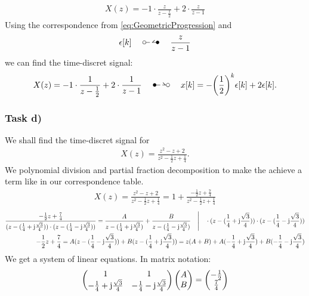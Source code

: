 \begin{align}
	X(z)=-1\cdot\frac{z}{z-\frac{1}{2}}+2\cdot\frac{z}{z-1}
\end{align}
Using the correspondence from \ref{eq:GeometricProgression} and 
\begin{align}
	\epsilon[k]\quad\ztransf\quad\frac{z}{z-1}
\end{align}
we can find the time-discret signal:
\begin{align}
	X(z)=-1\cdot\frac{1}{z-\frac{1}{2}}+2\cdot\frac{1}{z-1}\quad\Ztransf\quad x[k]=-\bigg(\frac{1}{2}\bigg)^k\epsilon[k]+2\epsilon[k].
\end{align}
\subsubsection{Task d)}
We shall find the time-discret signal for
\begin{align}
	X(z)=\frac{z^2-z+2}{z^2-\frac{1}{2}z+\frac{1}{4}}.
\end{align}
We polynomial division and partial fraction decomposition to make the achieve a term like in our correspondence table.
\begin{align}
	X(z)=\frac{z^2-z+2}{z^2-\frac{1}{2}z+\frac{1}{4}}=1+\frac{-\frac{1}{2}z+\frac{7}{4}}{z^2-\frac{1}{2}z+\frac{1}{4}}
\end{align}
\begin{align}
	\label{eq:TaskDPartialFractionDecomposition}
	\frac{-\frac{1}{2}z+\frac{7}{4}}{(z-(\frac{1}{4}+\im\frac{\sqrt{3}}{4}))\cdot(z-(\frac{1}{4}-\im\frac{\sqrt{3}}{4}))}=\frac{A}{z-(\frac{1}{4}+\im\frac{\sqrt{3}}{4})}+\frac{B}{z-(\frac{1}{4}-\im\frac{\sqrt{3}}{4})}\quad\Bigg | \quad \cdot (z-(\frac{1}{4}+\im\frac{\sqrt{3}}{4}))\cdot(z-(\frac{1}{4}-\im\frac{\sqrt{3}}{4}))\nonumber\\
	-\frac{1}{2}z+\frac{7}{4}=A(z-(\frac{1}{4}-\im\frac{\sqrt{3}}{4}))+B(z-(\frac{1}{4}+\im\frac{\sqrt{3}}{4}))=z(A+B)+A(-\frac{1}{4}+\im\frac{\sqrt{3}}{4})+B(-\frac{1}{4}-\im\frac{\sqrt{3}}{4})
\end{align}
We get a system of linear equations. In matrix notation:
\begin{align}
	\begin{pmatrix}
		1 & 1 \\
		-\frac{1}{4}+\im\frac{\sqrt{3}}{4} & -\frac{1}{4}-\im\frac{\sqrt{3}}{4} 
	\end{pmatrix}
	\begin{pmatrix}
		A \\
		B
	\end{pmatrix}
	=
	\begin{pmatrix}
		-\frac{1}{2} \\
		\frac{7}{4}
	\end{pmatrix}
\end{align}
